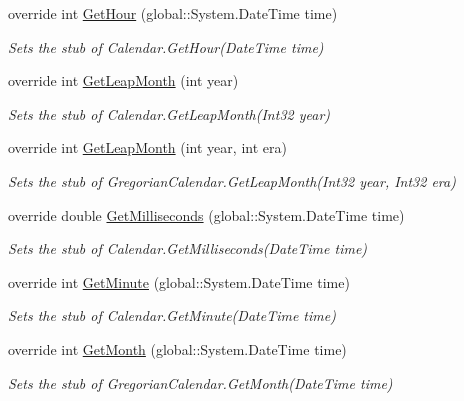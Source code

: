 \begin{DoxyCompactItemize}
override int \hyperlink{class_system_1_1_globalization_1_1_fakes_1_1_stub_gregorian_calendar_a04d4ec19b60cf60b207daf6442527a60}{Get\-Hour} (global\-::\-System.\-Date\-Time time)
\begin{DoxyCompactList}\small\item\em Sets the stub of Calendar.\-Get\-Hour(\-Date\-Time time)\end{DoxyCompactList}\item 
override int \hyperlink{class_system_1_1_globalization_1_1_fakes_1_1_stub_gregorian_calendar_a7fa1cd225cc37912d1308fd34e7a4694}{Get\-Leap\-Month} (int year)
\begin{DoxyCompactList}\small\item\em Sets the stub of Calendar.\-Get\-Leap\-Month(\-Int32 year)\end{DoxyCompactList}\item 
override int \hyperlink{class_system_1_1_globalization_1_1_fakes_1_1_stub_gregorian_calendar_a513146da38fbb809f90d844e2079784c}{Get\-Leap\-Month} (int year, int era)
\begin{DoxyCompactList}\small\item\em Sets the stub of Gregorian\-Calendar.\-Get\-Leap\-Month(\-Int32 year, Int32 era)\end{DoxyCompactList}\item 
override double \hyperlink{class_system_1_1_globalization_1_1_fakes_1_1_stub_gregorian_calendar_a870e0dcd509016600d73a10f784023bc}{Get\-Milliseconds} (global\-::\-System.\-Date\-Time time)
\begin{DoxyCompactList}\small\item\em Sets the stub of Calendar.\-Get\-Milliseconds(\-Date\-Time time)\end{DoxyCompactList}\item 
override int \hyperlink{class_system_1_1_globalization_1_1_fakes_1_1_stub_gregorian_calendar_a2091fe7dfe50a5f3e9a8e01a426d9d91}{Get\-Minute} (global\-::\-System.\-Date\-Time time)
\begin{DoxyCompactList}\small\item\em Sets the stub of Calendar.\-Get\-Minute(\-Date\-Time time)\end{DoxyCompactList}\item 
override int \hyperlink{class_system_1_1_globalization_1_1_fakes_1_1_stub_gregorian_calendar_a5d502437c56a744e1041b4087285e704}{Get\-Month} (global\-::\-System.\-Date\-Time time)
\begin{DoxyCompactList}\small\item\em Sets the stub of Gregorian\-Calendar.\-Get\-Month(\-Date\-Time time)\end{DoxyCompactList}\item 

\end{DoxyCompactItemize}
